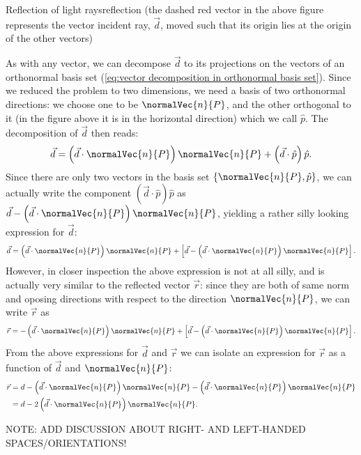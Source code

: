 \begin{example}{Reflection of light rays}{reflection}
\flushleft
(the dashed red vector in the above figure represents the vector incident ray, $\vec{d}$, moved such that its origin lies at the origin of the other vectors)

As with any vector, we can decompose $\vec{d}$ to its projections on the vectors of an orthonormal basis set (\autoref{eq:vector decomposition in orthonormal basis set}). Since we reduced the problem to two dimensions, we need a basis of two orthonormal directions: we choose one to be $\normalVec{n}{P}$, and the other orthogonal to it (in the figure above it is in the horizontal direction) which we call $\hat{p}$. The decomposition of $\vec{d}$ then reads:
\[
	\vec{d} = \left( \vec{d}\cdot\normalVec{n}{P} \right)\normalVec{n}{P} + \left( \vec{d}\cdot\hat{p} \right)\hat{p}.
\]
Since there are only two vectors in the basis set $\left\{ \normalVec{n}{P},\hat{p} \right\}$, we can actually write the component $\left( \vec{d}\cdot\hat{p} \right)\hat{p}$ as $\vec{d}-\left( \vec{d}\cdot\normalVec{n}{P} \right)\normalVec{n}{P}$, yielding a rather silly looking expression for $\vec{d}$:
\[
	\vec{d} = \left( \vec{d}\cdot\normalVec{n}{P} \right)\normalVec{n}{P} + \left[ \vec{d}-\left( \vec{d}\cdot\normalVec{n}{P} \right)\normalVec{n}{P} \right].
\]
However, in closer inspection the above expression is not at all silly, and is actually very similar to the reflected vector $\vec{r}$: since they are both of same norm and oposing directions with respect to the direction $\normalVec{n}{P}$, we can write $\vec{r}$ as
\[
	\vec{r} = -\left( \vec{d}\cdot\normalVec{n}{P} \right)\normalVec{n}{P} + \left[ \vec{d}-\left( \vec{d}\cdot\normalVec{n}{P} \right)\normalVec{n}{P} \right].
\]
From the above expressions for $\vec{d}$ and $\vec{r}$ we can isolate an expression for $\vec{r}$ as a function of $\vec{d}$ and $\normalVec{n}{P}$:
\begin{align*}
	\vec{r} &= d - \left( \vec{d}\cdot\normalVec{n}{P} \right)\normalVec{n}{P} - \left( \vec{d}\cdot\normalVec{n}{P} \right)\normalVec{n}{P}\\
	&= d-2\left( \vec{d}\cdot\normalVec{n}{P} \right)\normalVec{n}{P}.
\end{align*}
\end{example}

NOTE: ADD DISCUSSION ABOUT RIGHT- AND LEFT-HANDED SPACES/ORIENTATIONS!

